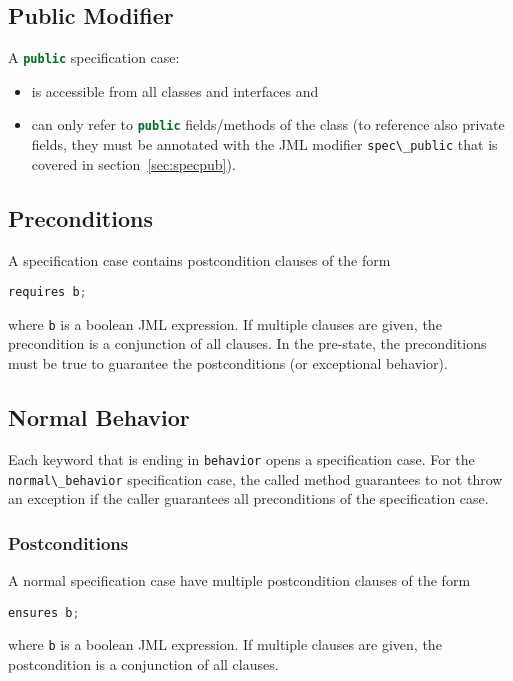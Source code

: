 \documentclass[a4paper, 11pt, accentcolor = tud3b]{tudreport}
\newcommand{\inlineJava}[1]{\lstinline[language = Java]|#1|}
\begin{document}
			\subsection{Public Modifier}
				A \inlineJava{public} specification case:
				\begin{itemize}
					\item is accessible from all classes and interfaces and
					\item can only refer to \inlineJava{public} fields/methods of the class (to reference also private fields, they must be annotated with the JML modifier \inlineJava{spec\_public} that is covered in section~\ref{sec:specpub}).
				\end{itemize}
			
			\subsection{Preconditions}
				\label{sec:precond}
			
				A specification case contains postcondition clauses of the form
				\begin{center}
					\inlineJava{requires b;}
				\end{center}
				where \texttt{b} is a boolean JML expression. If multiple clauses are given, the precondition is a conjunction of all clauses. In the pre-state, the preconditions must be true to guarantee the postconditions (or exceptional behavior).

			\subsection{Normal Behavior}
				Each keyword that is ending in \inlineJava{behavior} opens a specification case. For the \inlineJava{normal\_behavior} specification case, the called method guarantees to not throw an exception if the caller guarantees all preconditions of the specification case.
				
				\subsubsection{Postconditions}
					\label{sec:postcond1}
				
					A normal specification case have multiple postcondition clauses of the form
					\begin{center}
						\inlineJava{ensures b;}
					\end{center}
					where \texttt{b} is a boolean JML expression. If multiple clauses are given, the postcondition is a conjunction of all clauses.
					
\end{document}
